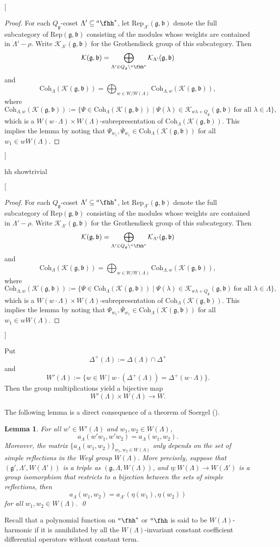 \documentclass[12pt,a4paper]{amsart}
\newcommand{\trivial}[2][]{\if\relax\detokenize{#1}\relax
  {%
      \color{orange} \vspace{0em} $[$  #2 $]$
      \color{black}
  }
  \else
\ifx#1h
\ifcsname showtrivial\endcsname
{%
    \color{orange} \vspace{0em}  $[$ #2 $]$
    \color{black}
}
\fi
\else {\red Wrong argument!} \fi
\fi
}
\def\subset{\subseteq}
\newcommand{\CH}{{\mathcal {H}}}
\newcommand{\CK}{{\mathcal {K}}}
\newcommand{\g}{\mathfrak g}
\renewcommand{\b}{\mathfrak b}
\newcommand{\be}{\begin {equation}}
\newcommand{\ee}{\end {equation}}
\numberwithin{equation}{section}
\newtheorem{lem}[thm]{Lemma}
\theoremstyle{remark}
\def\hha{{}^a\fhh}
\def\Coh{\mathrm{Coh}}
\begin{document}
\trivial[h]{\begin{proof}

For each $Q_\g$-coset  $\Lambda'\subset \hha^*$,
 let $\mathrm{Rep}_{\Lambda'}(\g, \b)$ denote the full subcategory of $\mathrm{Rep}(\g, \b)$ consisting of the modules whose weights are contained in $\Lambda'-\rho$.
 Write $\CK_{ \Lambda'}(\g, \b)$ for the Grothendieck group of this subcategory. Then
 \[
   \CK(\g, \b)=\bigoplus_{\Lambda'\in Q_\g\backslash \hha^*} \CK_{ \Lambda'}(\g, \b)
 \]
 and
 \be\label{decLam00}
 \Coh_{\Lambda}( \CK(\g,\b))=\bigoplus_{w\in W/W(\Lambda)}\Coh_{\Lambda,w}(\CK(\g, \b) ),
\ee
where
 \[
   \Coh_{\Lambda,w}( \CK(\g,\b)):=\{\Psi\in \Coh_{\Lambda}( \CK(\g,\b))\mid \Psi(\lambda)\in \CK_{w\lambda+Q_\g}(\g, \b)\ \textrm{for all } \lambda\in \Lambda\},
 \]
 which is a $W(w\cdot \Lambda)\times W(\Lambda)$-subrepresentation of  $\Coh_{\Lambda}( \CK(\g,\b))$. This implies the lemma by noting that $\Psi_{w_1}, \overline{\Psi}_{w_1}\in  \Coh_{\Lambda}( \CK(\g,\b))$ for all $w_1\in w  W(\Lambda)$. \end{proof}
}

Put
\[
  \Delta^+(\Lambda):=\Delta(\Lambda)\cap \Delta^+
\]
and
\be\label{wprime}
  W'(\Lambda):=\{w\in W\mid  w\cdot (\Delta^+(\Lambda) )= \Delta^+(w\cdot \Lambda)\}.
\ee
Then the group multiplications yield a bijective map
\[
  W'(\Lambda)\times W(\Lambda)\rightarrow W.
\]

The following lemma is a direct consequence of a theorem of Soergel (\cite[Section 2.5, Theorem 11]{Soergel}).
\begin{lem} \label{wprime0}
For all  $w'\in W'(\Lambda)$ and $w_1, w_2\in W(\Lambda)$,  $$a_{\Lambda}(w'w_1, w'w_2)= a_{\Lambda}(w_1, w_2).$$
Moreover, the matrix   $\{a_{\Lambda}(w_1, w_2)\}_{w_1, w_2\in W(\Lambda)}$ only depends on the set of simple reflections in the Weyl group $W(\Lambda)$.  More precisely, suppose that $(\g', \Lambda',  W(\Lambda'))$ is a triple as $(\g, \Lambda, W(\Lambda))$, and $\eta: W(\Lambda)\rightarrow W(\Lambda')$ is a group isomorphism that restricts to a bijection between the sets of  simple reflections, then $$a_{\Lambda}(w_1, w_2)=a_{\Lambda'}(\eta(w_1), \eta(w_2))$$ for all $w_1, w_2\in W(\Lambda)$.
\qed
\end{lem}


Recall that a polynomial function on $\hha^*$ or $\hha$ is said to be $W(\Lambda)$-harmonic if it is  annihilated by all the $W(\Lambda)$-invariant constant coefficient differential operators without constant term.
\end{document}
